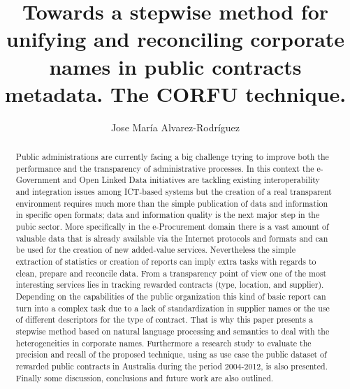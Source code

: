 \documentclass{llncs}
\begin{document}
\title{Towards a stepwise method for unifying and reconciling corporate names in public contracts metadata. The CORFU technique.}

\titlerunning{}

\author{Jose Mar\'{i}a Alvarez-Rodr\'{i}guez} 







\date{}

\maketitle

\renewcommand{\labelitemi}{$\bullet$}

\begin{abstract}
Public administrations are currently facing a big challenge trying to improve both the performance and the transparency of administrative processes.
In this context the e-Government and Open Linked Data initiatives are tackling existing interoperability and 
integration issues among ICT-based systems but the creation of a real transparent environment requires 
much more than the simple publication of data and information in specific open formats; data and information 
quality is the next major step in the pubic sector. More specifically in the e-Procurement domain there is a 
vast amount of valuable data that is already available via the Internet protocols and formats and can be used 
for the creation of new added-value services. Nevertheless the simple extraction of statistics or creation of reports 
can imply extra tasks with regards to clean, prepare and reconcile data. 
From a transparency point of view one of the most interesting services lies in tracking rewarded contracts (type, location, and supplier). 
Depending on the capabilities of the public organization this kind of basic report can turn into a 
complex task due to a lack of standardization in supplier names or the use of different descriptors for the type of contract. That is why 
this paper presents a stepwise method based on natural language processing and semantics to deal with the heterogeneities in corporate names. 
Furthermore a research study to evaluate the precision and recall of the proposed technique, using as use case the public dataset of rewarded public 
contracts in Australia during the period 2004-2012, is also presented. Finally some discussion, 
conclusions and future work are also outlined.
\end{abstract}
\end{document}
